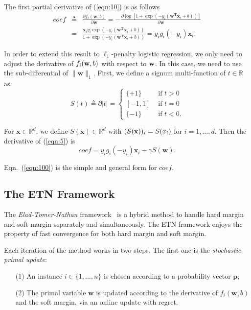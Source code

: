 \documentclass{llncs}
\newcommand{\bw}{\mathbf{w}}
\newcommand{\bp}{\mathbf{p}}
\newcommand{\dotwxb}{{\mathbf{w}}^{\mathbf{T}}\mathbf{x}_{i}+b}
\newcommand{\lc}{\left(}
\newcommand{\rc}{\right)}
\def\x{{\bf x}}
\def\w{{\bf w}}
\begin{document}
The first partial derivative of (\ref{eqn:10}) is as follows
	\begin{eqnarray} \label{eqn:11}
	coef &\triangleq & \frac{\partial f_i\lc\bw,b\rc}{\partial \bw}= - \frac{\partial\log  [1+\exp(-y_i ( \dotwxb))] } {\partial \bw}  \\
	&= &\frac{\mathbf{x}_i y_i \exp(-y_i  (\dotwxb) ) }{1+ \exp(-y_i \lc \dotwxb \rc)}
	=y_i g_i\lc -y_i  \rc\mathbf{x}_i.  \nonumber
	\end{eqnarray}

In order to extend this result to $\ell_1$-penalty logistic regression,
we only need to adjust the derivative of $f_i(\w, b)$ with respect to $\w$.
In this case, we need to use the sub-differential of $\|\bw\|_1$.  First, we define  a signum multi-function of $t\in\mathbb{R}$ as
	\[
	S(t) \triangleq \partial |t| =
		\begin{cases}
 		\{+1\} & \text{ if } t >0  \\
 		\left[-1,1\right]  & \text{ if } t=0  \\
 		\{-1\} & \text{ if } t<0.
		\end{cases}
	\]

For $\mathbf{x}\in\mathbb{R}^d$, we define $S\lc\mathbf{x}\rc \in \mathbb{R}^d$ with $(S(\x))_i=S(x_i)$ for $i=1, \ldots, d$.
Then the derivative of (\ref{eqn:5}) is
	\begin{equation}  \label{eqn:100}
	coef=y_i g_i\lc -y_i  \rc\mathbf{x}_i-\gamma S\lc\bw\rc.
	\end{equation}
	
	Eqn.~(\ref{eqn:100}) is the simple and general form  for $coef$.
		
\subsection{The ETN Framework}
	
The \textit{Elad-Tomer-Nathan} framework~\cite{hazanbeating} is a hybrid method to handle hard margin and soft margin separately and simultaneously.
The ETN framework enjoys the property of fast convergence for both hard margin and soft margin.
	
Each iteration of the method works in two steps.
The first one is the \textit{stochastic primal update}:

\begin{enumerate}
\item[{(1)}] \; An instance $i\in \{1,\ldots, n\}$ is chosen according to a probability vector $\bp$;
\item[{(2)}] \; The primal variable $\bw$ is updated according to the derivative of $f_i(\bw,b)$ and the soft margin, via an online update with regret.
\end{enumerate}
\end{document}
